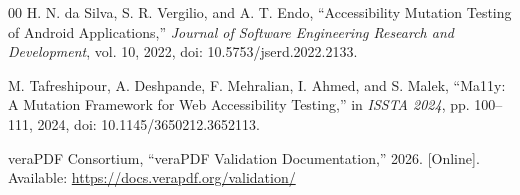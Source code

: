 \documentclass[conference]{IEEEtran}
\begin{document}
\begin{thebibliography}{00}
H. N. da Silva, S. R. Vergilio, and A. T. Endo, ``Accessibility Mutation Testing of Android Applications,'' \emph{Journal of Software Engineering Research and Development}, vol. 10, 2022, doi: 10.5753/jserd.2022.2133.

M. Tafreshipour, A. Deshpande, F. Mehralian, I. Ahmed, and S. Malek, ``Ma11y: A Mutation Framework for Web Accessibility Testing,'' in \emph{ISSTA 2024}, pp. 100--111, 2024, doi: 10.1145/3650212.3652113.

veraPDF Consortium, ``veraPDF Validation Documentation,'' 2026. [Online]. Available: \url{https://docs.verapdf.org/validation/}

\end{thebibliography}
\end{document}
